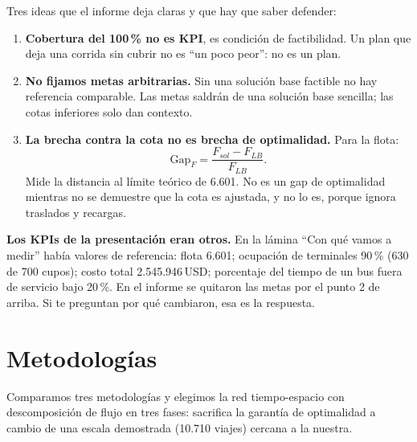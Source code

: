 \documentclass[11pt,a4paper,parskip=half]{scrartcl}
\newcounter{preg}
\begin{document}
Tres ideas que el informe deja claras y que hay que saber defender:
\begin{enumerate}
  \item \textbf{Cobertura del 100\,\% no es KPI}, es condición de factibilidad. Un plan que deja una corrida sin cubrir no es ``un poco peor'': no es un plan.
  \item \textbf{No fijamos metas arbitrarias.} Sin una solución base factible no hay referencia comparable. Las metas saldrán de una solución base sencilla; las cotas inferiores solo dan contexto.
  \item \textbf{La brecha contra la cota no es brecha de optimalidad.} Para la flota:
  \[
    \text{Gap}_F = \frac{F_{sol} - F_{LB}}{F_{LB}}.
  \]
  Mide la distancia al límite teórico de 6.601. No es un gap de optimalidad mientras no se demuestre que la cota es ajustada, y no lo es, porque ignora traslados y recargas.
\end{enumerate}

\textbf{Los KPIs de la presentación eran otros.} En la lámina ``Con qué vamos a medir'' había valores de referencia: flota 6.601; ocupación de terminales 90\,\% (630 de 700 cupos); costo total 2.545.946\,USD; porcentaje del tiempo de un bus fuera de servicio bajo 20\,\%. En el informe se quitaron las metas por el punto 2 de arriba. Si te preguntan por qué cambiaron, esa es la respuesta.

\section{Metodologías}
\label{sec:metodologias}

Comparamos tres metodologías y elegimos la red tiempo-espacio con descomposición de flujo en tres fases: sacrifica la garantía de optimalidad a cambio de una escala demostrada (10.710 viajes) cercana a la nuestra.
\end{document}
